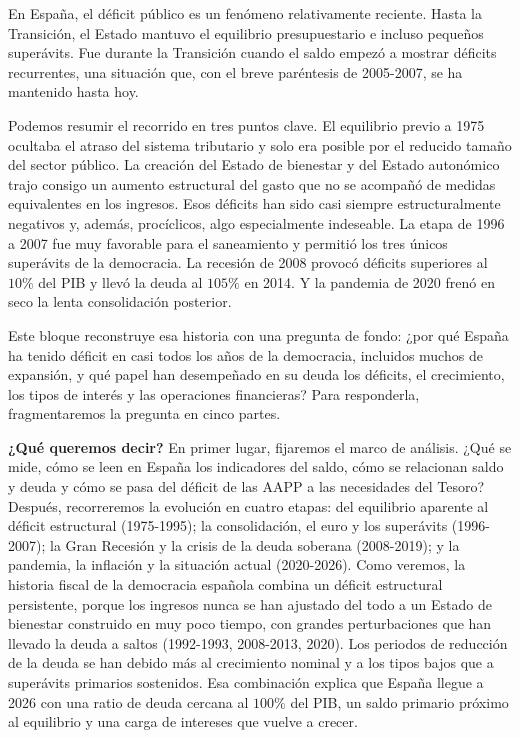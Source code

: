 \documentclass[10pt,a4paper]{article}
\begin{document}
En España, el déficit público es un fenómeno relativamente reciente. Hasta la Transición, el Estado mantuvo el equilibrio presupuestario e incluso pequeños superávits. Fue durante la Transición cuando el saldo empezó a mostrar déficits recurrentes, una situación que, con el breve paréntesis de 2005-2007, se ha mantenido hasta hoy. 

Podemos resumir el recorrido en tres puntos clave. El equilibrio previo a 1975 ocultaba el atraso del sistema tributario y solo era posible por el reducido tamaño del sector público. La creación del Estado de bienestar y del Estado autonómico trajo consigo un aumento estructural del gasto que no se acompañó de medidas equivalentes en los ingresos. Esos déficits han sido casi siempre estructuralmente negativos y, además, procíclicos, algo especialmente indeseable. La etapa de 1996 a 2007 fue muy favorable para el saneamiento y permitió los tres únicos superávits de la democracia. La recesión de 2008 provocó déficits superiores al $10\%$ del PIB y llevó la deuda al $105\%$ en 2014. Y la pandemia de 2020 frenó en seco la lenta consolidación posterior.

Este bloque reconstruye esa historia con una pregunta de fondo: ¿por qué España ha tenido déficit en casi todos los años de la democracia, incluidos muchos de expansión, y qué papel han desempeñado en su deuda los déficits, el crecimiento, los tipos de interés y las operaciones financieras? Para responderla, fragmentaremos la pregunta en cinco partes.

\textbf{¿Qué queremos decir?} En primer lugar, fijaremos el marco de análisis. ¿Qué se mide, cómo se leen en España los indicadores del saldo, cómo se relacionan saldo y deuda y cómo se pasa del déficit de las AAPP a las necesidades del Tesoro? Después, recorreremos la evolución en cuatro etapas: del equilibrio aparente al déficit estructural (1975-1995); la consolidación, el euro y los superávits (1996-2007); la Gran Recesión y la crisis de la deuda soberana (2008-2019); y la pandemia, la inflación y la situación actual (2020-2026). Como veremos, la historia fiscal de la democracia española combina un déficit estructural persistente, porque los ingresos nunca se han ajustado del todo a un Estado de bienestar construido en muy poco tiempo, con grandes perturbaciones que han llevado la deuda a saltos (1992-1993, 2008-2013, 2020). Los periodos de reducción de la deuda se han debido más al crecimiento nominal y a los tipos bajos que a superávits primarios sostenidos. Esa combinación explica que España llegue a 2026 con una ratio de deuda cercana al $100\%$ del PIB, un saldo primario próximo al equilibrio y una carga de intereses que vuelve a crecer.
\end{document}
